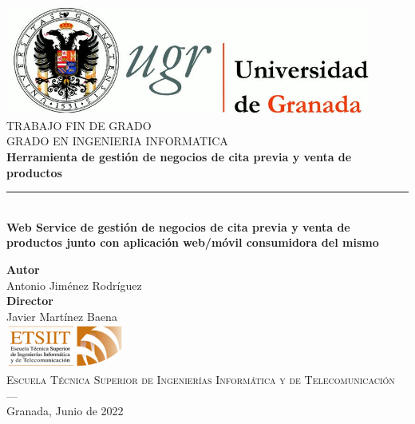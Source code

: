 \begin{titlepage}
\newlength{\centeroffset}
\setlength{\centeroffset}{-0.5\oddsidemargin}
\addtolength{\centeroffset}{0.5\evensidemargin}
\thispagestyle{empty}

\noindent\hspace*{\centeroffset}\begin{minipage}{\textwidth}

\centering
\includegraphics[width=0.9\textwidth]{logos/logo_ugr.jpg}\\[1.4cm]

\textsc{ \Large TRABAJO FIN DE GRADO\\[0.2cm]}
\textsc{ GRADO EN INGENIERIA INFORMATICA}\\[1cm]

{\Huge\bfseries Herramienta de gestión de negocios de cita previa y venta de productos \\}
\noindent\rule[-1ex]{\textwidth}{3pt}\\[3.5ex]
{\large\bfseries Web Service de gestión de negocios de cita previa y venta de productos junto con aplicación web/móvil consumidora del mismo }
\end{minipage}

\vspace{2.5cm}
\noindent\hspace*{\centeroffset}
\begin{minipage}{\textwidth}
\centering

\textbf{Autor}\\ {Antonio Jiménez Rodríguez}\\[2.5ex]
\textbf{Director}\\ {Javier Martínez Baena}\\[2cm]
\includegraphics[width=0.3\textwidth]{logos/etsiit_logo.png}\\[0.1cm]
\textsc{Escuela Técnica Superior de Ingenierías Informática y de Telecomunicación}\\
\textsc{---}\\
Granada, Junio de 2022
\end{minipage}
\end{titlepage}
